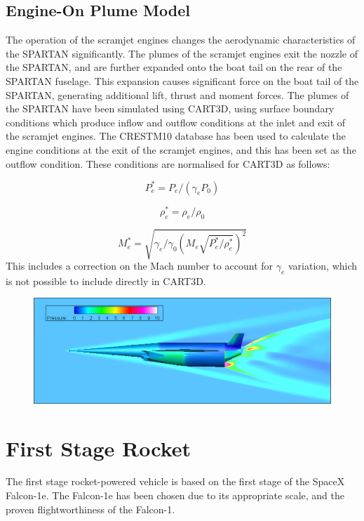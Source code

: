 \subsection{Engine-On Plume Model}

The operation of the scramjet engines changes the aerodynamic characteristics of the SPARTAN significantly. 
The plumes of the scramjet engines exit the nozzle of the SPARTAN, and are further expanded onto the boat tail on the rear of the SPARTAN fuselage. This expansion causes significant force on the boat tail of the SPARTAN, generating additional lift, thrust and moment forces. The plumes of the SPARTAN have been simulated using CART3D, using surface boundary conditions which produce inflow and outflow conditions at the inlet and exit of the scramjet engines. The CRESTM10 database has been used to calculate the engine conditions at the exit of the scramjet engines, and this has been set as the outflow condition. These conditions are normalised for CART3D as follows:

\begin{equation}
P_e^* = P_e/(\gamma_e P_0)
\end{equation}

\begin{equation}
\rho_e^* = \rho_e/\rho_0
\end{equation}

\begin{equation}
M_e^* = \sqrt{\gamma_e/\gamma_0 (M_e \sqrt{ P_e^*/\rho_e^*})^2}
\end{equation}
This includes a correction on the Mach number to account for $\gamma_e$ variation, which is not possible to include directly in CART3D.

\begin{figure}
	\centering
	\includegraphics[width=0.9\linewidth]{figures/3_vehicle_design/EngineOn-M7AoA024km}
	\caption{}
	\label{fig:EngineOn-M7AoA624km}
\end{figure}


\section{First Stage Rocket}
The first stage rocket-powered vehicle is based on the first stage of the SpaceX Falcon-1e. The Falcon-1e has been chosen due to its appropriate scale, and the proven flightworthiness of the Falcon-1.

